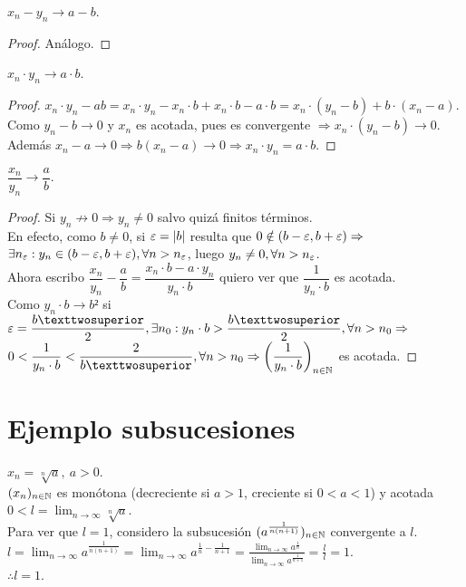 \begin{prop}
  $x_n - y_n \to a-b$.
  \begin{proof}
    Análogo.
  \end{proof}
\end{prop}

\begin{prop}
  $x_n \cdot y_n \to a \cdot b$.
  \begin{proof}
    $x_n \cdot y_n - ab = x_n \cdot y_n - x_n \cdot b + x_n \cdot b - a \cdot b = x_n \cdot (y_n - b) + b \cdot (x_n - a)$. \\
    Como $y_n - b \to 0$ y $x_n$ es acotada, pues es convergente $\Rightarrow x_n \cdot (y_n-b) \to 0$.
    Además $x_n - a \to 0 \Rightarrow b(x_n - a) \to 0 \Rightarrow x_n \cdot y_n = a \cdot b$.
  \end{proof}
\end{prop}

\clearpage

\begin{prop}
  $\dfrac{x_n}{y_n} \to \dfrac{a}{b}$.
  \begin{proof}
    Si $y_n \not \to 0 \Rightarrow y_n \neq 0$ salvo quizá finitos términos. \\
    En efecto, como $b \neq 0$, si $\varepsilon = |b|$ resulta que $0 \notin (b - \varepsilon, b + \varepsilon) \Rightarrow$ \\
    $\exists n_{\varepsilon} : y_n \in (b-\varepsilon, b+\varepsilon), \forall n > n_{\varepsilon}$, luego $y_n \neq 0, \forall n > n_{\varepsilon}$. \\

    Ahora escribo $\dfrac{x_n}{y_n} - \dfrac{a}{b} = \dfrac{x_n \cdot b - a \cdot y_n}{y_n \cdot b}$ quiero ver que $\dfrac{1}{y_n \cdot b}$ es acotada. \\
    Como $y_n \cdot b \to b²$ si $\e = \dfrac{b²}{2}, \exists n_0 : y_n \cdot b > \dfrac{b²}{2}, \forall n > n_0 \Rightarrow$ \\
    $0 < \dfrac{1}{y_n \cdot b} < \dfrac{2}{b²}, \forall n > n_0 \Rightarrow \left(\dfrac{1}{y_n \cdot b}\right)_{n \in \N}$ es acotada.
  \end{proof}
\end{prop}

\section{Ejemplo subsucesiones}

\begin{eg}
  $x_n = \sqrt[n]{a}, \ a > 0$. \\
  $(x_n)_{n \in \mathbb{N}}$ es monótona (decreciente si $a > 1$, creciente si $0 < a < 1$) y acotada $0 < l = \lim_{n \to \infty} \sqrt[n]{a}$. \\
  Para ver que $l = 1$, considero la subsucesión $(a^{\frac{1}{n(n+1)}})_{n \in \mathbb{N}}$ convergente a $l$. \\
  $l = \lim_{n \to \infty} a^{\frac{1}{n(n+1)}} = \lim_{n \to \infty} a^{\frac{1}{n} - \frac{1}{n+1}} =
    \frac{\lim_{n \to \infty} a^{\frac{1}{n}}}{\lim_{n \to \infty} a^{\frac{1}{n+1}}} = \frac{l}{l} = 1.$ \\
  $\therefore l = 1$.
\end{eg}

